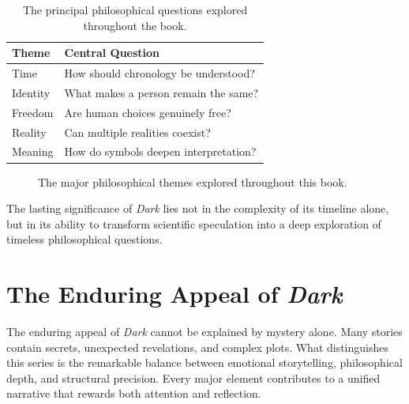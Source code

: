 \documentclass[12pt,oneside,openany]{book}
\begin{document}
\begin{table}[H]
\centering
\begin{tabular}{|p{4cm}|p{8cm}|}
\hline
\textbf{Theme} & \textbf{Central Question}\\
\hline
Time & How should chronology be understood?\\
\hline
Identity & What makes a person remain the same?\\
\hline
Freedom & Are human choices genuinely free?\\
\hline
Reality & Can multiple realities coexist?\\
\hline
Meaning & How do symbols deepen interpretation?\\
\hline
\end{tabular}
\caption{The principal philosophical questions explored throughout the book.}
\end{table}

\begin{figure}[H]
\centering
{}

\caption{The major philosophical themes explored throughout this book.}
\end{figure}

\begin{tcolorbox}[colback=gray!8,colframe=black,title=Final Reflection]
The lasting significance of \textit{Dark} lies not in the complexity of its
timeline alone, but in its ability to transform scientific speculation into a
deep exploration of timeless philosophical questions.
\end{tcolorbox}
\section{The Enduring Appeal of \textit{Dark}}

The enduring appeal of \textit{Dark} cannot be explained by mystery alone.
Many stories contain secrets, unexpected revelations, and complex plots. What
distinguishes this series is the remarkable balance between emotional
storytelling, philosophical depth, and structural precision. Every major
element contributes to a unified narrative that rewards both attention and
reflection.
\end{document}
